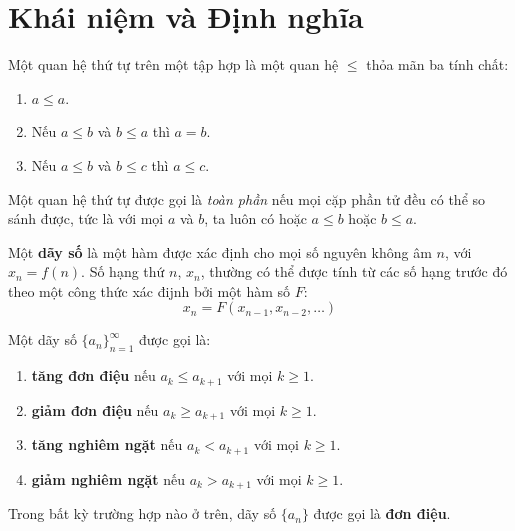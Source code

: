 \documentclass[../imo-training-open-book.tex]{subfiles}
\begin{document}
\chapter{Khái niệm và Định nghĩa}

\begin{definition*}
    \label{definition:order-relation}
    Một quan hệ thứ tự trên một tập hợp là một quan hệ \( \leq \) thỏa mãn ba tính chất:
    \begin{enumerate}[topsep=0pt, partopsep=0pt, itemsep=0pt]
        \item \( a \leq a \).
        \item Nếu \( a \leq b \) và \( b \leq a \) thì \( a = b \).
        \item Nếu \( a \leq b \) và \( b \leq c \) thì \( a \leq c \).
    \end{enumerate}
\end{definition*}

\begin{definition*}
    \label{definition:total-order-relation}
    Một quan hệ thứ tự được gọi là \textit{toàn phần} nếu mọi cặp phần tử đều có thể so sánh được, tức là với mọi \( a \) và \( b \),
    ta luôn có hoặc \( a \leq b \) hoặc \( b \leq a \).
\end{definition*}

\begin{definition*}[Dãy số]
    \label{definition:sequence}
    Một \textbf{dãy số} là một hàm được xác định cho mọi số nguyên không âm \( n \), với \( x_n = f(n) \).
    Số hạng thứ \( n \), \( x_n \), thường có thể được tính từ các số hạng trước đó theo một công thức xác đijnh bởi một hàm số $F$:
    \[
        x_n = F(x_{n-1}, x_{n-2}, \ldots)
    \]
\end{definition*}

\begin{definition*}
    \label{definition:monotonic-sequence}
    Một dãy số \( \{ a_n \}_{n=1}^\infty \) được gọi là:
    \begin{enumerate}[topsep=0pt, partopsep=0pt, itemsep=0pt]
        \item \textbf{tăng đơn điệu} nếu \( a_k \leq a_{k+1} \) với mọi \( k \geq 1 \).
        \item \textbf{giảm đơn điệu} nếu \( a_k \geq a_{k+1} \) với mọi \( k \geq 1 \).
        \item \textbf{tăng nghiêm ngặt} nếu \( a_k < a_{k+1} \) với mọi \( k \geq 1 \).
        \item \textbf{giảm nghiêm ngặt} nếu \( a_k > a_{k+1} \) với mọi \( k \geq 1 \).
    \end{enumerate}
    Trong bất kỳ trường hợp nào ở trên, dãy số \( \{ a_n \} \) được gọi là \textbf{đơn điệu}.
\end{definition*}
\end{document}
